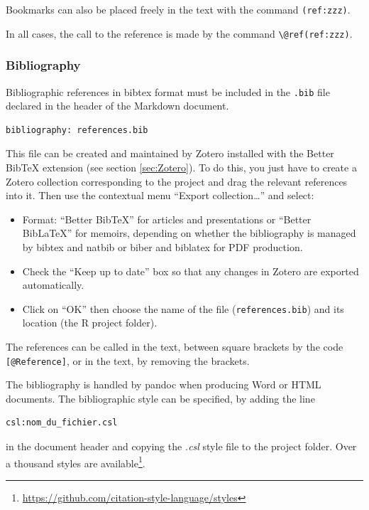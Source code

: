\documentclass[
  12pt,
  american,
  a4paper,
  extrafontsizes,onecolumn,openright
  ]{memoir}
\providecommand{\tightlist}{%
  \setlength{\itemsep}{0pt}\setlength{\parskip}{0pt}}
\begin{document}
Bookmarks can also be placed freely in the text with the command \texttt{(ref:zzz)}.

In all cases, the call to the reference is made by the command \texttt{\textbackslash{}@ref(ref:zzz)}.

\subsubsection{Bibliography}\label{bibliography}

Bibliographic references in bibtex format must be included in the \texttt{.bib} file declared in the header of the Markdown document.

\begin{verbatim}
bibliography: references.bib
\end{verbatim}

This file can be created and maintained by Zotero installed with the Better BibTeX extension (see section \ref{sec:Zotero}).
To do this, you just have to create a Zotero collection corresponding to the project and drag the relevant references into it.
Then use the contextual menu \enquote{Export collection\ldots{}} and select:

\begin{itemize}
\tightlist
\item
  Format: \enquote{Better BibTeX} for articles and presentations or \enquote{Better BibLaTeX} for memoirs, depending on whether the bibliography is managed by bibtex and natbib or biber and biblatex for PDF production.
\item
  Check the \enquote{Keep up to date} box so that any changes in Zotero are exported automatically.
\item
  Click on \enquote{OK} then choose the name of the file (\texttt{references.bib}) and its location (the R project folder).
\end{itemize}

The references can be called in the text, between square brackets by the code \texttt{{[}@Reference{]}}, or in the text, by removing the brackets.

The bibliography is handled by pandoc when producing Word or HTML documents.
The bibliographic style can be specified, by adding the line

\begin{verbatim}
csl:nom_du_fichier.csl
\end{verbatim}

in the document header and copying the \emph{.csl} style file to the project folder.
Over a thousand styles are available\footnote{\url{https://github.com/citation-style-language/styles}}.
\end{document}

